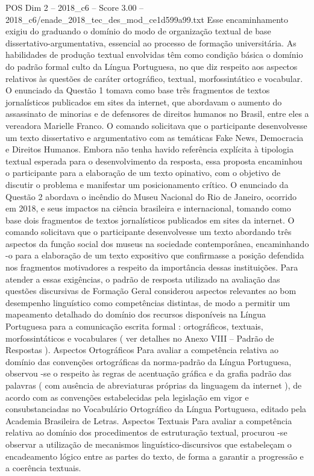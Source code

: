 \begin{textsample}{POS Dim 2 – 2018\_c6 – Score 3.00 – 2018\_c6/enade\_2018\_tec\_des\_mod\_ce1d599a99.txt}
Esse encaminhamento exigiu do graduando o domínio do modo de organização textual de base dissertativo-argumentativa, essencial ao processo de formação universitária.
As habilidades de produção textual envolvidas têm como condição básica o domínio do padrão formal culto da Língua Portuguesa, no que diz respeito aos aspectos relativos às questões de caráter ortográfico, textual, morfossintático e vocabular.
O enunciado da Questão 1 tomava como base três fragmentos de textos jornalísticos publicados em sites da internet, que abordavam o aumento do assassinato de minorias e de defensores de direitos humanos no Brasil, entre eles a vereadora Marielle Franco.
O comando solicitava que o participante desenvolvesse um texto dissertativo e argumentativo com as temáticas Fake News, Democracia e Direitos Humanos.
Embora não tenha havido referência explícita à tipologia textual esperada para o desenvolvimento da resposta, essa proposta encaminhou o participante para a elaboração de um texto opinativo, com o objetivo de discutir o problema e manifestar um posicionamento crítico.
O enunciado da Questão 2 abordava o incêndio do Museu Nacional do Rio de Janeiro, ocorrido em 2018, e seus impactos na ciência brasileira e internacional, tomando como base dois fragmentos de textos jornalísticos publicados em sites da internet.
O comando solicitava que o participante desenvolvesse um texto abordando três aspectos da função social dos museus na sociedade contemporânea, encaminhando -o para a elaboração de um texto expositivo que confirmasse a posição defendida nos fragmentos motivadores a respeito da importância dessas instituições.
Para atender a essas exigências, o padrão de resposta utilizado na avaliação das questões discursivas de Formação Geral considerou aspectos relevantes ao bom desempenho linguístico como competências distintas, de modo a permitir um mapeamento detalhado do domínio dos recursos disponíveis na Língua Portuguesa para a comunicação escrita formal : ortográficos, textuais, morfossintáticos e vocabulares ( ver detalhes no Anexo VIII – Padrão de Respostas ).
Aspectos Ortográficos Para avaliar a competência relativa ao domínio das convenções ortográficas da norma-padrão da Língua Portuguesa, observou -se o respeito às regras de acentuação gráfica e da grafia padrão das palavras ( com ausência de abreviaturas próprias da linguagem da internet ), de acordo com as convenções estabelecidas pela legislação em vigor e consubstanciadas no Vocabulário Ortográfico da Língua Portuguesa, editado pela Academia Brasileira de Letras.
Aspectos Textuais Para avaliar a competência relativa ao domínio dos procedimentos de estruturação textual, procurou -se observar a utilização de mecanismos linguístico-discursivos que estabeleçam o encadeamento lógico entre as partes do texto, de forma a garantir a progressão e a coerência textuais.

\end{textsample}
